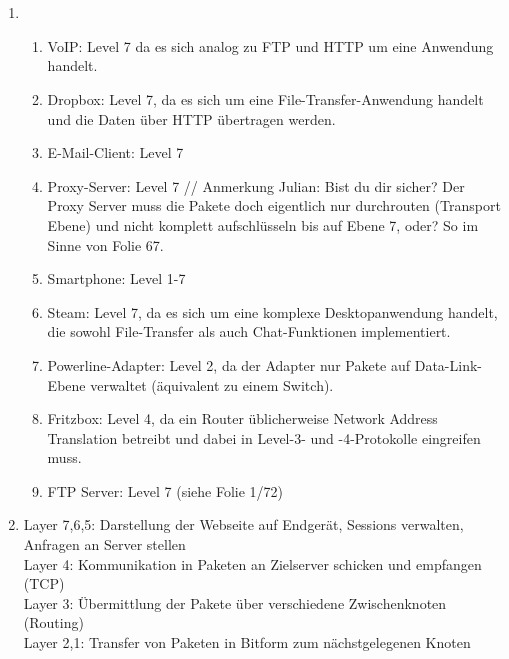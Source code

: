 \documentclass[a4paper,
			llpt,
			solution,
			accentcolor=tud2d,
			colorbacktitle
			]
			{tudexercise}
\begin{document}
              
\section{}
\begin{enumerate}
\item
\begin{enumerate}

\item
VoIP:
Level 7 da es sich analog zu FTP und HTTP um eine Anwendung handelt.

\item
Dropbox:
Level 7, da es sich um eine File-Transfer-Anwendung handelt und die Daten über HTTP übertragen werden.

\item
E-Mail-Client:
Level 7

\item
Proxy-Server:
Level 7 // Anmerkung Julian: Bist du dir sicher? Der Proxy Server muss die Pakete doch eigentlich nur durchrouten (Transport Ebene) und nicht komplett aufschlüsseln bis auf Ebene 7, oder? So im Sinne von Folie 67.

\item
Smartphone:
Level 1-7

\item
Steam:
Level 7, da es sich um eine komplexe Desktopanwendung handelt, die sowohl File-Transfer als auch Chat-Funktionen implementiert.

\item
Powerline-Adapter:
Level 2, da der Adapter nur Pakete auf Data-Link-Ebene verwaltet (äquivalent zu einem Switch).

\item
Fritzbox:
Level 4, da ein Router üblicherweise Network Address Translation betreibt und dabei in Level-3- und -4-Protokolle eingreifen muss.

\item
FTP Server:
Level 7 (siehe Folie 1/72)
\end{enumerate}
\item

Layer 7,6,5: Darstellung der Webseite auf Endgerät, Sessions verwalten, Anfragen an Server stellen
\\
Layer 4: Kommunikation in Paketen an Zielserver schicken und empfangen (TCP)
\\
Layer 3: Übermittlung der Pakete über verschiedene Zwischenknoten (Routing)
\\
Layer 2,1: Transfer von Paketen in Bitform zum nächstgelegenen Knoten


\end{enumerate}
\end{document}
